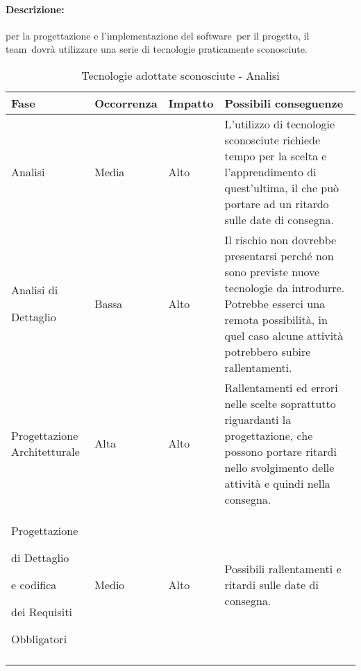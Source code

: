 \documentclass[../PianoProgetto.tex]{subfiles}
\begin{document}
	\paragraph*{Descrizione:} per la progettazione e l'implementazione del software\g\ per il progetto, il team\g\ dovrà utilizzare una serie di tecnologie praticamente sconosciute.
	

	\hspace{0pt}
		\begin{longtabu} to \textwidth {X[.55] X[c .50] X[c .50] X}
			\toprule
			\textbf{Fase} & \textbf{Occorrenza} & \textbf{Impatto} & \textbf{Possibili conseguenze}\\
			\midrule
			\endhead			
			
			Analisi & Media & Alto & L'utilizzo di tecnologie sconosciute richiede tempo per la scelta e l'apprendimento di quest'ultima, il che può portare ad un ritardo sulle date di consegna. \\
			\midrule
			Analisi di \par Dettaglio & Bassa & Alto & Il rischio non dovrebbe presentarsi perché non sono previste nuove tecnologie da introdurre. Potrebbe esserci una remota possibilità, in quel caso alcune attività potrebbero subire rallentamenti. \\
			\midrule
			Progettazione Architetturale & Alta & Alto & Rallentamenti ed errori nelle scelte soprattutto riguardanti la progettazione, che possono portare ritardi nello svolgimento delle attività e quindi nella consegna.\\
			\midrule
			Progettazione \par di Dettaglio \par e codifica \par dei Requisiti \par Obbligatori & Medio & Alto & Possibili rallentamenti e ritardi sulle date di consegna.\\
			\bottomrule
			
			\caption{Tecnologie adottate sconosciute - Analisi}
			\label{tab:Tecnologie adottate sconosciute - Analisi}
		\end{longtabu}
\end{document}
